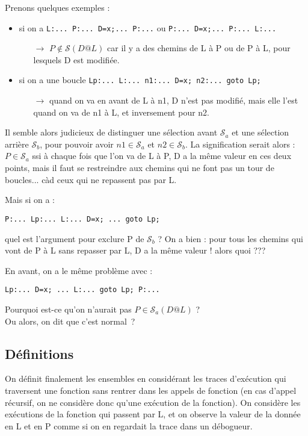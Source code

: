 \documentclass[a4paper,twoside]{article}
\renewcommand{\sc}{\mathcal{S}}
\newcommand{\sca}{\mathcal{S}_a}
\newcommand{\scb}{\mathcal{S}_b}
\begin{document}
Prenons quelques exemples :

\begin{itemize}
  \item si on a \verb!L:... P:... D=x;... P:...!
     ou \verb!P:... D=x;... P:... L:...!
     \begin{itemize}\item[$\rightarrow$]
   $P \notin \sc(D@L)$
   car il y a des chemins de L à P ou de P à L, pour lesquels D est modifiée.
     \end{itemize}

   \item si on a une boucle \verb!Lp:... L:... n1:... D=x; n2:... goto Lp;!
     \begin{itemize}\item[$\rightarrow$]
	   quand on va en avant de L à n1, D n'est pas modifié,
	   mais elle l'est quand on va de n1 à L, et inversement pour n2.
     \end{itemize}
\end{itemize}

Il semble alors judicieux de distinguer une sélection avant $\sca$
et une sélection arrière $\scb$, pour pouvoir avoir $n1 \in \sca$ et $n2 \in \scb$.  
La signification serait alors : 
$P \in \sca$ ssi à chaque fois que l'on va de L à P, 
D a la même valeur en ces deux points, 
mais il faut se restreindre aux chemins qui ne font pas un tour de boucles... 
càd ceux qui ne repassent pas par L.

Mais si on a : 

\centerline{\verb!P:... Lp:... L:... D=x; ... goto Lp;!}

quel est l'argument pour exclure P de $\scb$ ?
On a bien : pour tous les chemins qui vont de P à L sans repasser par L,
  D a la même valeur ! alors quoi ???

En avant, on a le même problème avec :

\centerline{\verb!Lp:... D=x; ... L:... goto Lp; P:...!}

Pourquoi est-ce qu'on n'aurait pas $P \in \sca(D@L)$ ?\\

Ou alors, on dit que c'est normal~?

\subsection{Définitions}

On définit finalement les ensembles en considérant les traces d'exécution
qui traversent une fonction 
sans rentrer dans les appels de fonction (en cas d'appel récursif, on ne
considère donc qu'une exécution de la fonction).
On considère les exécutions de la fonction
qui passent par L, et on observe la valeur de la donnée en L et en P
comme si on en regardait la trace dans un débogueur.
\end{document}
